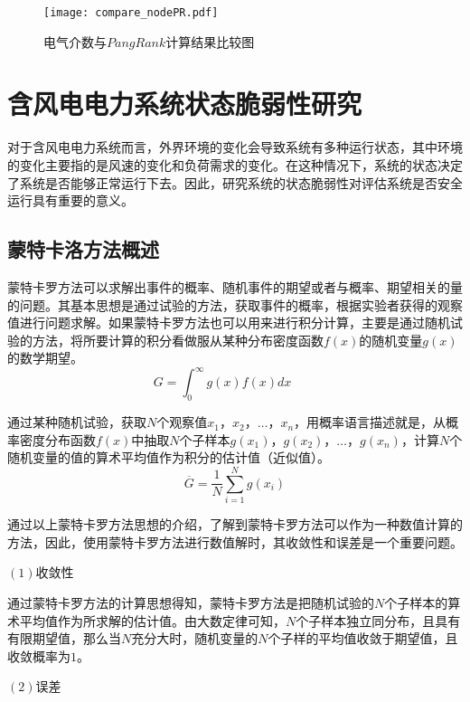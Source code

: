 \begin{figure}[H] %
  \centering
  \texttt{[image: compare\_nodePR.pdf]}
  \caption{电气介数与$PangRank$计算结果比较图}
  \label{fig:compare_nodePR}
\end{figure}

\section{含风电电力系统状态脆弱性研究}
\label{sec:status}
对于含风电电力系统而言，外界环境的变化会导致系统有多种运行状态，其中环境的变化主要指的是风速的变化和负荷需求的变化。在这种情况下，系统的状态决定了系统是否能够正常运行下去。因此，研究系统的状态脆弱性对评估系统是否安全运行具有重要的意义。

\subsection{蒙特卡洛方法概述}
\label{sec:vulneStaus}
蒙特卡罗方法可以求解出事件的概率、随机事件的期望或者与概率、期望相关的量的问题。其基本思想是通过试验的方法，获取事件的概率，根据实验者获得的观察值进行问题求解\cite{metcrlo1,metcrlo2,metcrlo3}。如果蒙特卡罗方法也可以用来进行积分计算，主要是通过随机试验的方法，将所要计算的积分看做服从某种分布密度函数$f(x)$的随机变量$g(x)$的数学期望。
\begin{equation}
\label{equ:chap3:Index4}
G=\int_{0}^{\infty}g(x)f(x)dx\qquad
\end{equation}

通过某种随机试验，获取$N$个观察值$x_1$，$x_2$，$\dots$，$x_n$，用概率语言描述就是，从概率密度分布函数$f(x)$中抽取$N$个子样本$g(x_1)$，$g(x_2)$，$\dots$，$g(x_n)$，计算$N$个随机变量的值的算术平均值作为积分的估计值（近似值）。
\begin{equation}
\label{equ:chap3:Index5}
\overline{G}=\frac{1}{N}\sum_{i=1}^{N}g(x_i)
\end{equation}

通过以上蒙特卡罗方法思想的介绍，了解到蒙特卡罗方法可以作为一种数值计算的方法，因此，使用蒙特卡罗方法进行数值解时，其收敛性和误差是一个重要问题。

$(1)$收敛性

通过蒙特卡罗方法的计算思想得知，蒙特卡罗方法是把随机试验的$N$个子样本的算术平均值作为所求解的估计值。由大数定律可知，$N$个子样本独立同分布，且具有有限期望值，那么当$N$充分大时，随机变量的$N$个子样的平均值收敛于期望值，且收敛概率为$1$。

$(2)$误差

